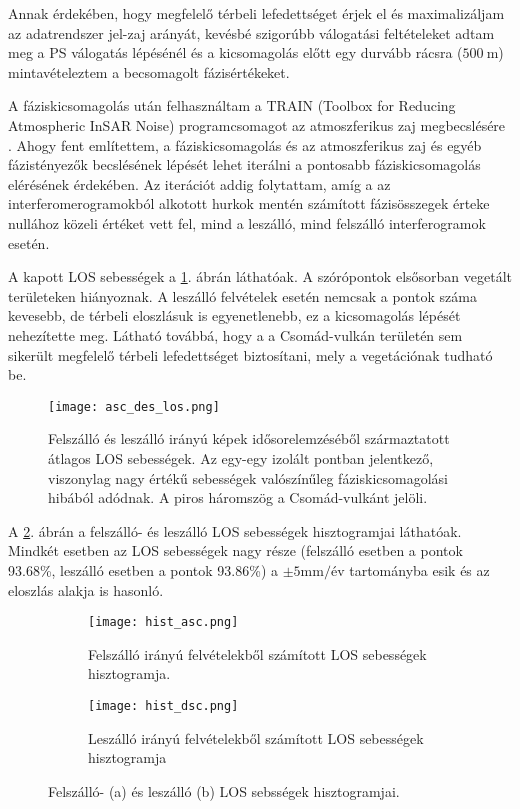 \documentclass[12pt]{report}
\numberwithin{equation}{section}
\numberwithin{table}{section}
\numberwithin{figure}{section}
\begin{document}
Annak érdekében, hogy megfelelő térbeli lefedettséget érjek el és maximalizáljam az adatrendszer jel-zaj arányát, kevésbé szigorúbb válogatási feltételeket adtam meg a PS válogatás lépésénél és a kicsomagolás előtt egy durvább rácsra ($\SI{500}{\meter}$) mintavételeztem a becsomagolt fázisértékeket.

A fáziskicsomagolás után felhasználtam a TRAIN (Toolbox for Reducing Atmospheric InSAR Noise) programcsomagot az atmoszferikus zaj megbecslésére \cite{train}. Ahogy fent említettem, a fáziskicsomagolás és az atmoszferikus zaj és egyéb fázistényezők becslésének lépését lehet iterálni a pontosabb fáziskicsomagolás elérésének érdekében. Az iterációt addig folytattam, amíg a az interferomerogramokból alkotott hurkok mentén számított fázisösszegek érteke nullához közeli értéket vett fel, mind a leszálló, mind felszálló interferogramok esetén.

A kapott LOS sebességek a \ref{asc_dsc_los}. ábrán láthatóak. A szórópontok elsősorban vegetált területeken hiányoznak. A leszálló felvételek esetén nemcsak a pontok száma kevesebb, de térbeli eloszlásuk is egyenetlenebb, ez a kicsomagolás lépését nehezítette meg. Látható továbbá, hogy a a Csomád-vulkán területén sem sikerült megfelelő térbeli lefedettséget biztosítani, mely a vegetációnak tudható be.

\begin{figure}[H]
    \centering
    \texttt{[image: asc\_des\_los.png]}
    \caption{Felszálló és leszálló irányú képek idősorelemzéséből származtatott átlagos LOS sebességek. Az egy-egy izolált pontban jelentkező, viszonylag nagy értékű sebességek valószínűleg fáziskicsomagolási hibából adódnak. A piros háromszög a Csomád-vulkánt jelöli.}\label{asc_dsc_los}
\end{figure}

A \ref{asc_dsc_hist}. ábrán a felszálló- és leszálló LOS sebességek hisztogramjai láthatóak. Mindkét esetben az LOS sebességek nagy része (felszálló esetben a pontok 93.68\%, leszálló esetben a pontok 93.86\%) a $\pm 5 \text{mm}/\text{év}$ tartományba esik és az eloszlás alakja is hasonló.

\begin{center}
    \begin{figure}[H]
        \begin{subfigure}[t]{.49\linewidth}
            \centering
            \texttt{[image: hist\_asc.png]}
            \caption{Felszálló irányú felvételekből számított LOS sebességek hisztogramja.}
        \end{subfigure}
        \hspace{10pt}
        \begin{subfigure}[t]{.49\linewidth}
            \centering
            \texttt{[image: hist\_dsc.png]}
            \caption{Leszálló irányú felvételekből számított LOS sebességek hisztogramja}
        \end{subfigure}
    \caption{Felszálló- (a) és leszálló (b) LOS sebsségek hisztogramjai.}\label{asc_dsc_hist}
    \end{figure}
\end{center}
\end{document}
